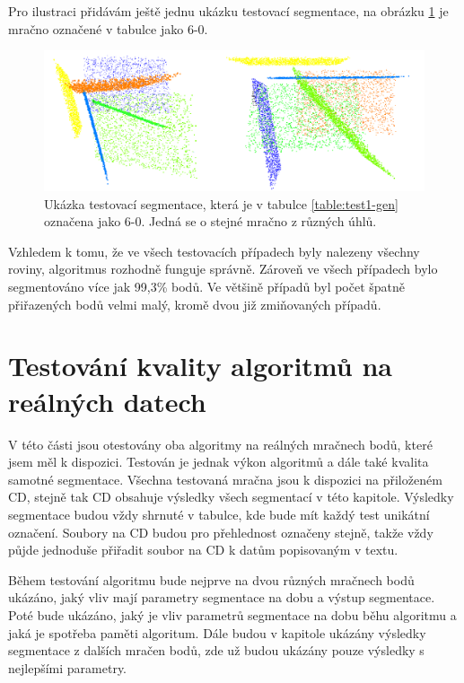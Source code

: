 \documentclass[11pt,twoside,a4paper]{book}
\begin{document}
Pro ilustraci přidávám ještě jednu ukázku testovací segmentace, na obrázku \ref{fig:test-6-0} je mračno označené v tabulce jako 6-0.

\begin{figure}[H]
\begin{center}
\includegraphics[width=\textwidth]{figures/test-6-0}
\caption{Ukázka testovací segmentace, která je v tabulce \ref{table:test1-gen} označena jako 6-0. Jedná se o stejné mračno z různých úhlů.}
\label{fig:test-6-0}
\end{center}
\end{figure}

Vzhledem k tomu, že ve všech testovacích případech byly nalezeny všechny roviny, algoritmus rozhodně funguje správně. Zároveň ve všech případech bylo segmentováno více jak 99,3\% bodů. Ve většině případů byl počet špatně přiřazených bodů velmi malý, kromě dvou již zmiňovaných případů.

\newpage
\section{Testování kvality algoritmů na reálných datech}

V této části jsou otestovány oba algoritmy na reálných mračnech bodů, které jsem měl k dispozici. Testován je jednak výkon algoritmů a dále také kvalita samotné segmentace. Všechna testovaná mračna jsou k dispozici na přiloženém CD, stejně tak CD obsahuje výsledky všech segmentací v této kapitole. Výsledky segmentace budou vždy shrnuté v tabulce, kde bude mít každý test unikátní označení. Soubory na CD budou pro přehlednost označeny stejně, takže vždy půjde jednoduše přiřadit soubor na CD k datům popisovaným v textu.

Během testování algoritmu bude nejprve na dvou různých mračnech bodů ukázáno, jaký vliv mají parametry segmentace na dobu a výstup segmentace. Poté bude ukázáno, jaký je vliv parametrů segmentace na dobu běhu algoritmu a jaká je spotřeba paměti algoritum. Dále budou v kapitole ukázány výsledky segmentace z dalších mračen bodů, zde už budou ukázány pouze výsledky s nejlepšími parametry.
\end{document}
